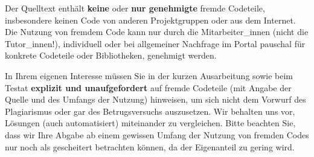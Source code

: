 Der Quelltext enth\"alt \textbf{keine} oder \textbf{nur genehmigte} 
fremde Codeteile, insbesondere keinen Code von anderen Projektgruppen
oder aus dem Internet. Die Nutzung von fremdem Code kann nur durch
die Mitarbeiter\_innen (nicht die Tutor\_innen!), individuell oder bei allgemeiner Nachfrage im
Portal pauschal f\"ur konkrete Codeteile oder Bibliotheken, genehmigt werden.

In Ihrem eigenen Interesse müssen Sie in der kurzen Ausarbeitung
sowie beim Testat \textbf{explizit und unaufgefordert} auf fremde Codeteile
(mit Angabe der Quelle und des Umfangs der Nutzung) hinweisen, um
sich nicht dem Vorwurf des Plagiarismus oder gar des Betrugsversuchs
auszusetzen. Wir behalten uns vor, L\"osungen (auch automatisiert)
miteinander zu vergleichen. Bitte beachten Sie, dass wir Ihre Abgabe 
ab einem gewissen Umfang der Nutzung von fremden Codes
nur noch als gescheitert betrachten können, da der Eigenanteil zu gering wird.

